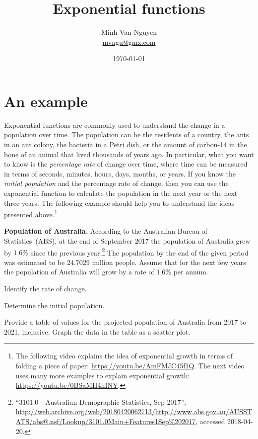 \documentclass[a4paper,oneside,12pt]{article}
\begin{document}
\title{\Large\bf Exponential functions}
\author{%
  Minh Van Nguyen \\
  \url{mvngu@gmx.com}
}
\date{\today}
\maketitle



\section{An example}

Exponential functions are commonly used to understand the change in a
population over time.  The population can be the residents of a
country, the ants in an ant colony, the bacteria in a Petri dish, or
the amount of carbon-14 in the bone of an animal that lived thousands
of years ago.  In particular, what you want to know is the
\emph{percentage rate} of change over time, where time can be measured
in terms of seconds, minutes, hours, days, months, or years.  If you
know the \emph{initial population} and the percentage rate of change,
then you can use the exponential function to calculate the population
in the next year or the next three years.  The following example
should help you to understand the ideas presented above.\footnote{
  The following video explains the idea of exponential growth in terms
  of folding a piece of paper:
  \url{https://youtu.be/AmFMJC45f1Q}.
  The next video uses many more examples to explain exponential
  growth:
  \url{https://youtu.be/0BSaMH4hINY}.
}

\begin{example}
\label{eg:Australian_population_2017}
\textbf{Population of Australia.}
According to the Australian Bureau of Statistics~(ABS), at the end of
September 2017 the population of Australia grew by $1.6\%$ since the
previous year.\footnote{
  ``3101.0 - Australian Demographic Statistics, Sep 2017'',
  \url{http://web.archive.org/web/20180420062713/http://www.abs.gov.au/AUSSTATS/abs@.nsf/Lookup/3101.0Main+Features1Sep\%202017},
  accessed 2018-04-20.
}
The population by the end of the given period was estimated to be
$24.7029$ million people.  Assume that for the next few years the
population of Australia will grow by a rate of $1.6\%$ per annum.
\begin{packedenum}
\item\label{subeg:Australian_population_2017_growth_rate}
  Identify the rate of change.

\item\label{subeg:Australian_population_2017_initial_population}
  Determine the initial population.

\item\label{subeg:Australian_population_2017_table_graph}
  Provide a table of values for the projected population of Australia
  from 2017 to 2021, inclusive.  Graph the data in the table as a
  scatter plot.
\end{packedenum}
\end{example}
\end{document}
